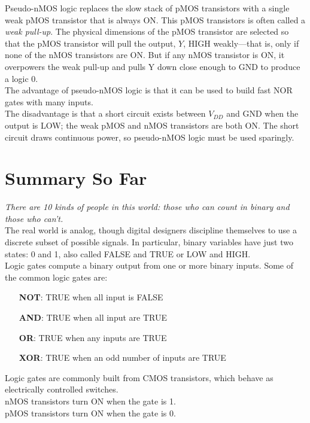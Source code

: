 \documentclass[12pt]{article}
\theoremstyle{definition}
\begin{document}
  Pseudo-nMOS logic replaces the slow stack of pMOS transistors with a single weak pMOS transistor that is always ON.
  This pMOS transistors is often called a \emph{weak pull-up}.
  The physical dimensions of the pMOS transistor are selected so that the pMOS transistor will pull the output, $Y$, HIGH weakly---that is, only if none of the nMOS transistors are ON.
  But if any nMOS transistor is ON, it overpowers the weak pull-up and pulls Y down close enough to GND to produce a logic 0. \\

  The advantage of pseudo-nMOS logic is that it can be used to build fast NOR gates with many inputs. \\
  The disadvantage is that a short circuit exists between $V_{DD}$ and GND when the output is LOW; the weak pMOS and nMOS transistors are both ON.
  The short circuit draws continuous power, so pseudo-nMOS logic must be used sparingly.

  \section{Summary So Far}
  \emph{There are 10 kinds of people in this world: those who can count in
binary and those who can't.} \\
  The real world is analog, though digital designers discipline themselves to use a discrete subset of possible signals.
  In particular, binary variables have just two states: 0 and 1, also called FALSE and TRUE or LOW and HIGH. \\

  Logic gates compute a binary output from one or more binary inputs.
  Some of the common logic gates are:
  \begin{itemize}
    \item[\textbf{NOT}:] TRUE when all input is FALSE
    \item[\textbf{AND}:] TRUE when all input are TRUE
    \item[\textbf{OR}:]  TRUE when any inputs are TRUE
    \item[\textbf{XOR}:] TRUE when an odd number of inputs are TRUE
  \end{itemize}

  Logic gates are commonly built from CMOS transistors, which behave as electrically controlled switches. \\
  nMOS transistors turn ON when the gate is 1. \\
  pMOS transistors turn ON when the gate is 0.
\end{document}
